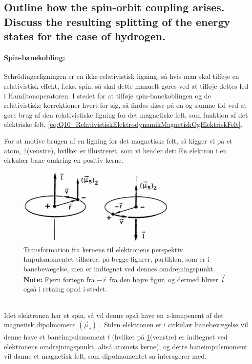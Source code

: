 \subsection{Outline how the spin-orbit coupling arises. Discuss the resulting splitting of the energy states for the case of hydrogen.}


\paragraph{Spin-banekobling:}
Schrödingerligningen er en ikke-relativistisk ligning, så hvis man skal tilføje en relativistisk effekt, f.eks. spin, så skal dette manuelt gøres ved at tilføje dettes led i Hamiltonoperatoren. I stedet for at tilføje spin-banekoblingen og de relativistiske korrektioner hvert for sig, så findes disse på en og samme tid ved at gøre brug af den relativistiske ligning for det magnetiske felt, som funktion af det elektriske felt, \cref{eq:Q10_RelativistiskElektrodynamikMagnetiskOgElektriskFelt}.

For at motive brugen af en ligning for det magnetiske felt, så kigger vi på et atom, \cref{fig:Q10_SpinOrbitCouplingAtomFremDifferentPerspectives}(venstre), hvilket er illustreret, som vi kender det: En elektron i en cirkulær bane omkring en positiv kerne.
\begin{figure}[!h]
    \centering
    \includegraphics[width=0.7\textwidth]{Q10/images/SpinOrbiCouplingAtomFromDifferentPerspectives.PNG}
    \caption{Transformation fra kernens til elektronens perspektiv. Impulsmomentet tilhører, på begge figurer, partiklen, som er i banebevægelse, men er indtegnet ved dennes omdrejningspunkt. \textbf{Note:} Fjern fortegn fra $-\Vec{r}$ fra den højre figur, og dermed bliver $\Vec{l}$ også i retning opad i stedet.}
    \label{fig:Q10_SpinOrbitCouplingAtomFremDifferentPerspectives}
\end{figure}\\
Idet elektronen har et spin, så vil denne også have en $z$-kompenent af det magnetisk dipolmoment $\left(\Vec{\mu}_s\right)_z$. Siden elektronen er i cirkulær banebevægelse vil denne have et baneimpulsmoment $l$ (hvilket på \cref{fig:Q10_SpinOrbitCouplingAtomFremDifferentPerspectives}(venstre) er indtegnet ved elektronens omdrejningspunkt, altså atomets kerne), og dette baneimpulsmoment vil danne et magnetisk felt, som dipolmomentet så interagerer med.

